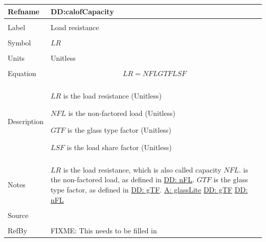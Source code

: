 \documentclass[12pt]{article}
\begin{document}
\noindent \begin{minipage}{\textwidth}
\begin{tabular}{p{} p{}}
\toprule \textbf{Refname} & \textbf{DD:calofCapacity}
\label{DD:calofCapacity}
\\ \midrule \\
Label & Load resistance
\\ \midrule \\
Symbol & $LR$
\\ \midrule \\
Units & Unitless
\\ \midrule \\
Equation & \begin{dmath}
           LR=NFL GTF LSF
           \end{dmath}
\\ \midrule \\
Description & \begin{symbDescription}
              \item{$LR$ is the load resistance (Unitless)}
              \item{$NFL$ is the non-factored load (Unitless)}
              \item{$GTF$ is the glass type factor (Unitless)}
              \item{$LSF$ is the load share factor (Unitless)}
              \end{symbDescription}
\\ \midrule \\
Notes & $LR$ is the load resistance, which is also called capacity $NFL$. is the non-factored load, as defined in \hyperref[DD:nFL]{DD: nFL}. $GTF$ is the glass type factor, as defined in \hyperref[DD:gTF]{DD: gTF}.
        \hyperref[A:glassLite]{A: glassLite}
        \hyperref[DD:gTF]{DD: gTF}
        \hyperref[DD:nFL]{DD: nFL}
\\ \midrule \\
Source & \cite{astm2009}
\\ \midrule \\
RefBy & FIXME: This needs to be filled in
\\ \bottomrule \end{tabular}
\end{minipage}\\
~\newline
\end{document}
